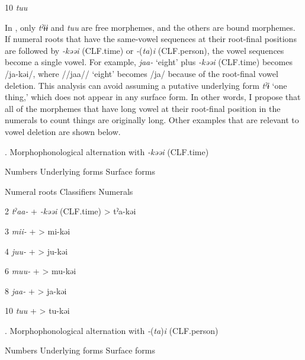 10  \textit{tuu}

\begin{styleBeschriftung}
\textmd{In , only} \textmd{\textit{tˀɨɨ}}\textmd{ and} \textmd{\textit{tuu}}\textmd{ are free morphemes, and the others are bound morphemes. If numeral roots that have the same-vowel sequences at their root-final positions are followed by} \textmd{\textit{{}-kəəi}}\textmd{ (CLF.time) or} \textmd{\textit{{}-}}\textmd{(}\textmd{\textit{ta}}\textmd{)}\textmd{\textit{i} }\textmd{(CLF.person), the vowel sequences become a single vowel. For example,} \textmd{\textit{jaa-}}\textmd{ ‘eight’ plus} \textmd{\textit{{}-kəəi}}\textmd{ (CLF.time) becomes /ja-kəi/, where //jaa// ‘eight’ becomes /ja/ because of the root-final vowel deletion. This analysis} \textmd{can avoid assuming a putative underlying form} \textmd{\textit{tˀɨ}}\textmd{ ‘one thing,’ which does not appear in any surface form. In other words, I propose that all of the morphemes that have long vowel at their root-final position in the numerals to count things are originally long. Other examples that are relevant to vowel deletion are shown below.}
\end{styleBeschriftung}

\begin{styleBeschriftung}
\textmd{. Morphophonological alternation with} \textmd{\textit{{}-kəəi}}\textmd{ (CLF.time)}
\end{styleBeschriftung}

Numbers  Underlying forms    Surface forms

  Numeral roots    Classifiers    Numerals

2  \textit{tˀaa-}  +  \textit{{}-kəəi} (CLF.time)  >  tˀa-kəi

3  \textit{mii-}  +    >  mi-kəi

4  \textit{juu-}  +    >  ju-kəi

6  \textit{muu-}  +    >  mu-kəi

8  \textit{jaa-}  +    >  ja-kəi

10  \textit{tuu}  +    >  tu-kəi

\begin{styleBeschriftung}
\textmd{}\textmd{. Morphophonological alternation with} \textmd{\textit{{}-}}\textmd{(}\textmd{\textit{ta}}\textmd{)}\textmd{\textit{i}}\textmd{ (CLF.person)}
\end{styleBeschriftung}

Numbers  Underlying forms    Surface forms

